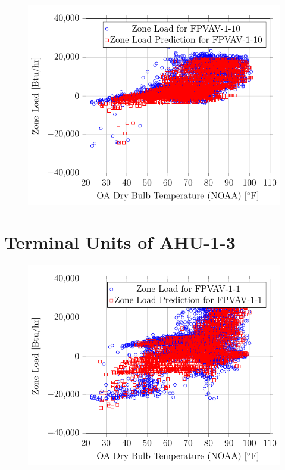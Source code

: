 \begin{figure}
\centering
\includegraphics[]{Plots/25/2017-06-27-1353-BtuhrvsOADryBulbTemperatureNOAAF.pdf}
\caption{}
\label{fig:2017-06-27-1353-BtuhrvsOADryBulbTemperatureNOAAF}
\end{figure}

\section{Terminal Units of AHU-1-3}

\begin{figure}
\centering
\includegraphics[]{Plots/26/2017-06-27-1355-BtuhrvsOADryBulbTemperatureNOAAF.pdf}
\caption{}
\label{fig:2017-06-27-1355-BtuhrvsOADryBulbTemperatureNOAAF}
\end{figure}


